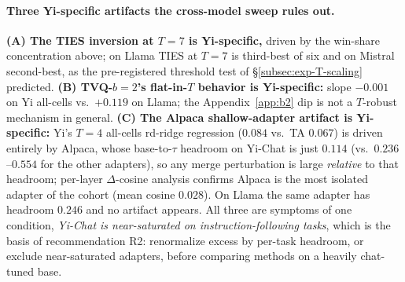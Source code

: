 \paragraph{Three Yi-specific artifacts the cross-model sweep rules
out.} \textbf{(A) The TIES inversion at $T = 7$ is Yi-specific,}
driven by the win-share concentration above; on Llama TIES at $T = 7$
is third-best of six and on Mistral second-best, as the pre-registered
threshold test of \S\ref{subsec:exp-T-scaling} predicted.
\textbf{(B) TVQ-$b{=}2$'s flat-in-$T$ behavior is Yi-specific:} slope
$-0.001$ on Yi all-cells vs.\ $+0.119$ on Llama; the
Appendix~\ref{app:b2} dip is not a $T$-robust mechanism in general.
\textbf{(C) The Alpaca shallow-adapter artifact is Yi-specific:} Yi's
$T = 4$ all-cells rd-ridge regression ($0.084$ vs.\ TA $0.067$) is
driven entirely by Alpaca, whose base-to-$\tau$ headroom on Yi-Chat is
just $0.114$ (vs.\ $0.236$--$0.554$ for the other adapters), so any
merge perturbation is large \emph{relative} to that headroom; per-layer
$\Delta$-cosine analysis confirms Alpaca is the most isolated adapter
of the cohort (mean cosine $0.028$). On Llama the same adapter has
headroom $0.246$ and no artifact appears. All three are symptoms of
one condition, \emph{Yi-Chat is near-saturated on
instruction-following tasks}, which is the basis of recommendation
R2: renormalize excess by per-task headroom, or exclude near-saturated
adapters, before comparing methods on a heavily chat-tuned base.

